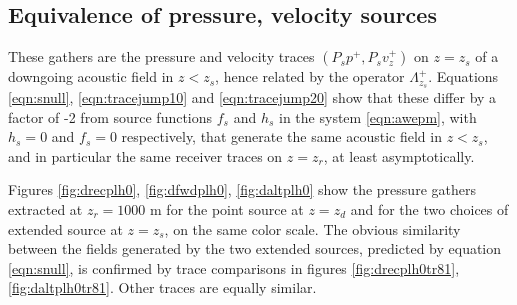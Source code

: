 \documentclass[georeport,12pt]{geophysics}
\newcommand{\bv}{\mathbf{v}}
\begin{document}
\subsection{Equivalence of pressure, velocity sources}
These gathers are the pressure and
velocity traces
$(P_sp^+,P_sv^+_z)$ on $z=z_s$ of a downgoing acoustic field in
$z<z_s$, hence related by the operator $\Lambda^+_{z_s}$.
Equations \ref{eqn:snull}, \ref{eqn:tracejump10} and
\ref{eqn:tracejump20} show that these differ by a factor of -2 from
source functions $f_s$ and $h_s$ in the system \ref{eqn:awepm},
with $h_s=0$ and $f_s=0$ respectively, that generate the same acoustic
field in $z<z_s$, and in particular the same receiver traces on
$z=z_r$, at least asymptotically.


Figures
\ref{fig:drecplh0}, \ref{fig:dfwdplh0}, \ref{fig:daltplh0} show the pressure
gathers extracted at $z_r=1000$ m for the point source at $z=z_d$ and
for the two choices of extended source at $z=z_s$, on the same color
scale. The obvious similarity between the fields generated by the two
extended sources,
predicted by equation \ref{eqn:snull}, is confirmed by trace
comparisons in figures %
\ref{fig:drecplh0tr81},\ref{fig:daltplh0tr81}. Other traces are
equally similar.



\end{document}
